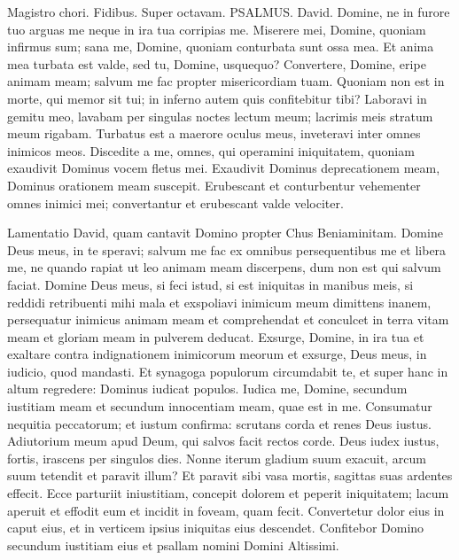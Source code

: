 \begin{biblechapter}  
\verse  Magistro chori. Fidibus. Super octavam. PSALMUS. David. 
\verse Domine, ne in furore tuo arguas me neque in ira tua corripias me. 
\verse Miserere mei, Domine, quoniam infirmus sum; sana me, Domine, quoniam conturbata sunt ossa mea. 
\verse Et anima mea turbata est valde, sed tu, Domine, usquequo? 
\verse Convertere, Domine, eripe animam meam; salvum me fac propter misericordiam tuam. 
\verse Quoniam non est in morte, qui memor sit tui; in inferno autem quis confitebitur tibi? 
\verse Laboravi in gemitu meo, lavabam per singulas noctes lectum meum; lacrimis meis stratum meum rigabam. 
\verse Turbatus est a maerore oculus meus, inveteravi inter omnes inimicos meos. 
\verse Discedite a me, omnes, qui operamini iniquitatem, quoniam exaudivit Dominus vocem fletus mei. 
\verse Exaudivit Dominus deprecationem meam, Dominus orationem meam suscepit. 
\verse Erubescant et conturbentur vehementer omnes inimici mei; convertantur et erubescant valde velociter. 
\end{biblechapter}

\begin{biblechapter}  
\verse  Lamentatio David, quam cantavit Domino propter Chus Beniaminitam. 
\verse Domine Deus meus, in te speravi; salvum me fac ex omnibus persequentibus me et libera me, 
\verse ne quando rapiat ut leo animam meam discerpens, dum non est qui salvum faciat. 
\verse Domine Deus meus, si feci istud, si est iniquitas in manibus meis, 
\verse si reddidi retribuenti mihi mala et exspoliavi inimicum meum dimittens inanem, 
\verse persequatur inimicus animam meam et comprehendat et conculcet in terra vitam meam et gloriam meam in pulverem deducat. 
\verse Exsurge, Domine, in ira tua et exaltare contra indignationem inimicorum meorum et exsurge, Deus meus, in iudicio, quod mandasti. 
\verse Et synagoga populorum circumdabit te, et super hanc in altum regredere: 
\verse Dominus iudicat populos. Iudica me, Domine, secundum iustitiam meam et secundum innocentiam meam, quae est in me. 
\verse Consumatur nequitia peccatorum; et iustum confirma: scrutans corda et renes Deus iustus. 
\verse Adiutorium meum apud Deum, qui salvos facit rectos corde. 
\verse Deus iudex iustus, fortis, irascens per singulos dies. 
\verse Nonne iterum gladium suum exacuit, arcum suum tetendit et paravit illum? 
\verse Et paravit sibi vasa mortis, sagittas suas ardentes effecit. 
\verse Ecce parturiit iniustitiam, concepit dolorem et peperit iniquitatem; 
\verse lacum aperuit et effodit eum et incidit in foveam, quam fecit. 
\verse Convertetur dolor eius in caput eius, et in verticem ipsius iniquitas eius descendet. 
\verse Confitebor Domino secundum iustitiam eius et psallam nomini Domini Altissimi. 
\end{biblechapter}


